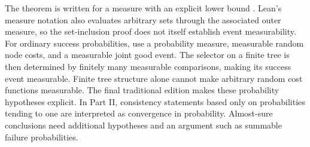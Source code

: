 The theorem is written for a measure with an explicit lower bound . Lean's measure notation also evaluates arbitrary sets through the associated outer measure, so the set-inclusion proof does not itself establish event measurability. For ordinary success probabilities, use a probability measure, measurable random node costs, and a measurable joint good event. The selector on a finite tree is then determined by finitely many measurable comparisons, making its success event measurable. Finite tree structure alone cannot make arbitrary random cost functions measurable. The final traditional edition makes these probability hypotheses explicit. In Part II, consistency statements based only on probabilities tending to one are interpreted as convergence in probability. Almost-sure conclusions need additional hypotheses and an argument such as summable failure probabilities.
